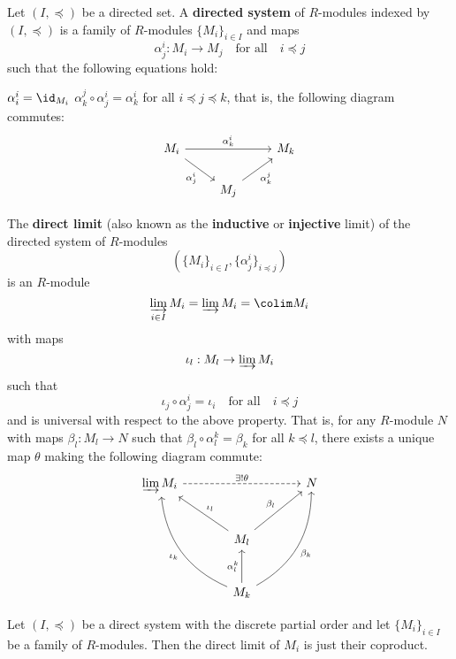 \begin{defn}[1.13]
	\begin{enum}
		\io Let $(I,\preceq)$ be a directed set.
		A \textbf{directed system} of $R$-modules indexed by $(I,\preceq)$ is a family of $R$-modules $\{M_i\}_{i \in I}$ and maps
		\[\alpha_j^i: M_i \to M_j \quad \text{for all} \quad i \preceq j\]
		such that the following equations hold:
		\begin{enum}
			\io $\alpha_i^i= \id_{M_i}$
			\io $\alpha_k^j \circ \alpha_j^i = \alpha_k^i$ for all $i \preceq j \preceq k$, that is, the following diagram commutes:
			\[
			\begin{tikzcd}
				M_i \arrow[rd, "\alpha_j^i"'] \arrow[rr, "\alpha_k^i"] &  & M_k \\
				& M_j \arrow[ru, "\alpha_k^j"'] & 
			\end{tikzcd}
			\]
		\end{enum}
		\io The \textbf{direct limit} (also known as the \textbf{inductive} or \textbf{injective} limit)
		of the directed system of $R$-modules
		\[\left(\{M_i\}_{i \in I}, \{\alpha_j^i\}_{i \preceq j}\right)\]
		is an $R$-module
		\[\varinjlim_{i \in I} M_i = \varinjlim M_i = \colim M_i\]
		with maps
		\[\iota_l: M_l \to \varinjlim M_i\]
		such that
		\[\iota_j \circ \alpha_j^i = \iota_i \quad \text{for all} \quad i \preceq j\]
		and is universal with respect to the above property.
		That is, for any $R$-module $N$ with maps $\beta_l: M_l \to N$ such that $\beta_l \circ \alpha_l^k=\beta_k$ for all $k \preceq l$, there exists a unique map $\theta$ making the following diagram commute:
		\[
		\begin{tikzcd}[row sep=large, column sep=large]
			\varinjlim M_i \arrow[rr, "\exists !\theta", dashed] & & N \\
			& M_l \arrow[lu, "\iota_l"'] \arrow[ru, "\beta_l"] &  \\
			& M_k \arrow[luu, "\iota_k", bend left] \arrow[ruu, swap, "\beta_k", bend right] \arrow[u, "\alpha_l^k"] & 
		\end{tikzcd}
		\]
	\end{enum}
\end{defn}

\begin{exam}
	Let $(I,\preceq)$ be a direct system with the discrete partial order and let $\{M_i\}_{i \in I}$ be a family of $R$-modules.
	Then the direct limit of $M_i$ is just their coproduct.
\end{exam}